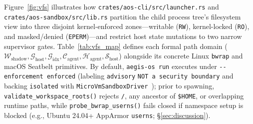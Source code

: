 \documentclass[10pt,twocolumn]{article}
\begin{document}
Figure~\ref{fig:vfs} illustrates how \texttt{crates/\allowbreak aos-cli/\allowbreak src/\allowbreak launcher.rs} and \texttt{crates/\allowbreak aos-sandbox/\allowbreak src/\allowbreak lib.rs} partition the child process tree's filesystem view into three disjoint kernel-enforced zones---writable (\texttt{RW}), kernel-locked (\texttt{RO}), and masked/denied (\texttt{EPERM})---and restrict host state mutations to two narrow supervisor gates. Table~\ref{tab:vfs_map} defines each formal path domain ($\mathcal{W}_{\text{shadow}}, \mathcal{G}_{\text{host}}, \mathcal{G}_{\text{idx}}, \mathcal{C}_{\text{agent}}, \mathcal{H}_{\text{agent}}, \mathcal{S}_{\text{host}}$) alongside its concrete Linux \texttt{bwrap} and macOS Seatbelt primitives. By default, \texttt{aegis-os run} executes under \texttt{-\/-enforcement enforced} (labeling \texttt{advisory} \texttt{NOT a security boundary} and backing \texttt{isolated} with \texttt{MicroVmSandboxDriver}~\cite{agache2020firecracker}); prior to spawning, \texttt{validate\_workspace\_roots()} rejects \texttt{/}, any ancestor of \texttt{\$HOME}, or overlapping runtime paths, while \texttt{probe\_bwrap\_userns()} fails closed if namespace setup is blocked (e.g., Ubuntu 24.04+ AppArmor \texttt{userns}; \S\ref{sec:discussion}).
\end{document}
